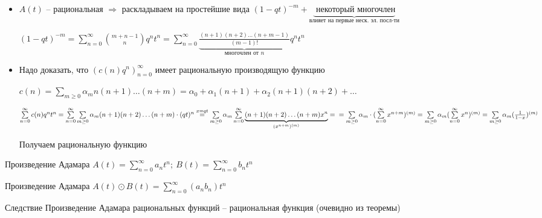 \documentclass[12pt]{article}
\begin{document}
\begin{itemize}
    \item["$\Rightarrow$"\ ] $A(t)$ -- рациональная $\Rightarrow$ раскладываем на простейшие вида $(1 - qt)^{-m} + \underbrace{\text{ некоторый многочлен}}_\text{влияет на первые неск. эл. посл-ти}$
    
    $(1 - qt)^{-m} = \sum\limits_{n = 0}^\infty {m + n - 1 \choose n} q^nt^n = \sum\limits_{n = 0}^\infty \underbrace{\frac{(n + 1)(n + 2)\ldots(n + m - 1)}{(m - 1)!}}_\text{многочлен от $n$}q^nt^n$

    \item["$\Leftarrow$"\ ] Надо доказать, что $(c(n)q^n)_{n = 0}^\infty$ имеет рациональную производящую функцию
    
    $c(n) = \sum\limits_{m \geq 0} \alpha_m n(n + 1)\ldots(n + m) = \alpha_0 + \alpha_1(n + 1) + \alpha_2(n + 1)(n + 2) + \ldots$

    $\sum\limits_{n = 0}^\infty c(n)q^nt^n = \sum\limits_{n = 0}^\infty \sum\limits_{m \geq 0} \alpha_m(n + 1)(n + 2) \ldots (n + m) \cdot (qt)^n \stackrel{x = qt}{=} \sum\limits_{m \geq 0} \alpha_m \sum\limits_{n = 0}^\infty \underbrace{(n + 1)(n + 2) \ldots (n + m) x^n}_{(x^{n + m})^{(m)}} = \\
     = \sum\limits_{m \geq 0} \alpha_m \cdot (\sum\limits_{n = 0}^\infty x^{n + m})^{(m)} = \sum\limits_{m \geq 0} \alpha_m (\sum\limits_{n = 0}^\infty x^n)^{(m)} = \sum\limits_{m \geq 0} \alpha_m (\frac{1}{1 - x})^{(m)}$

     Получаем рациональную функцию 
\end{itemize}

\begin{defin}{Произведение Адамара}
    $A(t) = \sum\limits_{n = 0}^\infty a_nt^n;\ B(t) = \sum\limits_{n = 0}^\infty b_nt^n$

    Произведение Адамара $A(t) \odot B(t) = \sum\limits_{n = 0}^\infty (a_nb_n)t^n$
\end{defin}

\begin{theo}{Следствие}
    Произведение Адамара рациональных функций -- рациональная функция (очевидно из теоремы)
\end{theo}
\end{document}

